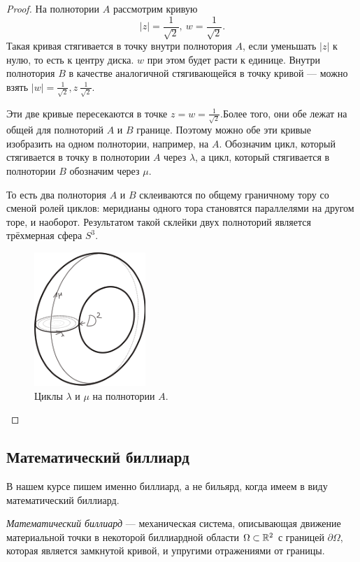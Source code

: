 \begin{proof}
    На полнотории $A$ рассмотрим кривую
    \[|z| = \frac{1}{\sqrt2}, \ w = \frac{1}{\sqrt2}.\]
    Такая кривая стягивается в точку внутри полнотория $A$, если уменьшать $|z|$ к нулю, то есть к центру диска. $w$ при этом будет расти к единице. Внутри полнотория $B$ в качестве аналогичной стягивающейся в точку кривой — можно взять $|w| = \frac{1}{\sqrt2}, z \ \frac{1}{\sqrt2}$.

    Эти две кривые пересекаются в точке $z = w = \frac{1}{\sqrt2}$.Более того, они обе лежат на общей для полноторий $A$ и $B$ границе. Поэтому можно обе эти кривые изобразить на одном полнотории, например, на $A$. Обозначим цикл, который стягивается в точку в полнотории $A$ через $\lambda$, а цикл, который стягивается в полнотории $B$ обозначим через $\mu$.

    То есть два полнотория $A$ и $B$ склеиваются по общему граничному тору со сменой ролей циклов: меридианы одного тора становятся параллелями на другом торе, и наоборот. Результатом такой склейки двух полноторий является трёхмерная сфера $S^3$.

    \begin{figure}[ht]
        \centering
        \includegraphics[scale=0.8]{images/c15.8.png}
        \caption{Циклы $\lambda$ и $\mu$ на полнотории $A$.}
        \label{fig:c15.8}
    \end{figure}
\end{proof} 


\subsection{Математический биллиард}
В нашем курсе пишем именно биллиард, а не бильярд, когда имеем в виду математический биллиард.
\begin{definition}
    \textit{Математический биллиард} — механическая система, описывающая движение материальной точки в некоторой биллиардной области $\Omega \subset \mathbb{R}^2$ с границей $\partial \Omega$, которая является замкнутой кривой, и упругими отражениями от границы.
\end{definition} 

